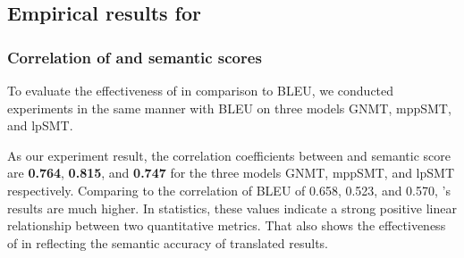 \subsection{Empirical results for {\model}}
\subsubsection{Correlation of {\model} and semantic scores}
To evaluate the effectiveness of {\model} in comparison to BLEU, we
conducted experiments in the same manner with BLEU on three models
GNMT, mppSMT, and lpSMT.

%

As our experiment result, the correlation coefficients between {\model} and
semantic score are \textbf{0.764}, \textbf{0.815}, and \textbf{0.747} for the 
three models GNMT, mppSMT, and lpSMT  respectively. Comparing to the correlation 
of BLEU of 0.658, 0.523, and 0.570, {\model}'s results are much higher. 
In statistics, these values indicate a strong positive linear relationship between two 
quantitative metrics. That also shows the effectiveness of {\model} in reflecting the 
semantic accuracy of translated results.



